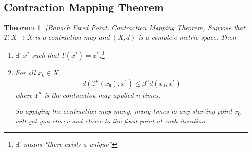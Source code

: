 \documentclass[12pt]{article}
\numberwithin{equation}{section} %
\theoremstyle{plain}
\newtheorem{thm}{Theorem}[section]
\theoremstyle{definition}
\theoremstyle{remark}
\begin{document}
\subsection{Contraction Mapping Theorem}

\begin{thm}{\emph{(Banach Fixed Point, Contraction Mapping Theorem)}}
\label{thm:banach}
Suppose that $T:X\rightarrow X$ is a contraction map and $(X,d)$ is a
complete metric space. Then
\begin{enumerate}
  \item $\exists! \; x^*$ such that $T(x^*)=x^*$.\footnote{%
      $\exists!$ means ``there exists a unique''}
  \item For all $x_0 \in X$,
    \begin{align}
      \label{thm:fixed-bound1}
      d(T^n(x_0), x^*) \leq \beta^n d(x_0,x^*)
    \end{align}
    where $T^n$ is the contraction map applied $n$ times.

    So applying the contraction map many, many times to any starting
    point $x_0$ will get you closer and closer to the fixed point at
    each iteration.
\end{enumerate}
\end{thm}
\end{document}
